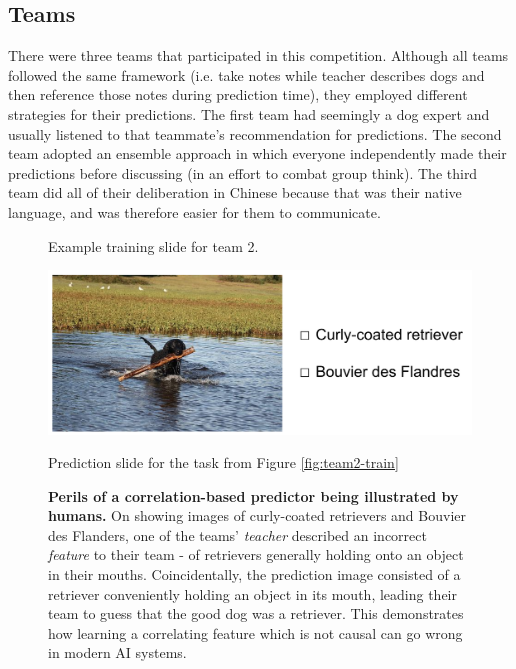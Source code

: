 \documentclass[sigplan,10pt]{acmart}
\begin{document}
\subsection{Teams}

There were three teams that participated in this competition. Although all teams followed the same framework (i.e. take notes while teacher describes dogs and then reference those notes during prediction time), they employed different strategies for their predictions. The first team had seemingly a dog expert and usually listened to that teammate's recommendation for predictions. The second team adopted an ensemble approach in which everyone independently made their predictions before discussing (in an effort to combat group think). The third team did all of their deliberation in Chinese because that was their native language, and was therefore easier for them to communicate.


\begin{figure}[!h]
    \caption{Example training slide for team 2.}
    \label{fig:team2-train}
\endminipage\hfill
{}%
	\includegraphics[width=1.2\textwidth]{images/ex1-test.png}
    \caption{Prediction slide for the task from Figure \ref{fig:team2-train}}
    \label{fig:team2-test}
\endminipage
\caption{\textbf{Perils of a correlation-based predictor being illustrated by humans.} On showing images of curly-coated retrievers and Bouvier des Flanders, one of the teams' \textit{teacher} described an incorrect \textit{feature} to their team - of retrievers generally holding onto an object in their mouths. Coincidentally, the prediction image consisted of a retriever conveniently holding an object in its mouth, leading their team to guess that the good dog was a retriever. This demonstrates how learning a correlating feature which is not causal can go wrong in modern AI systems.}
\end{figure}
\end{document}
